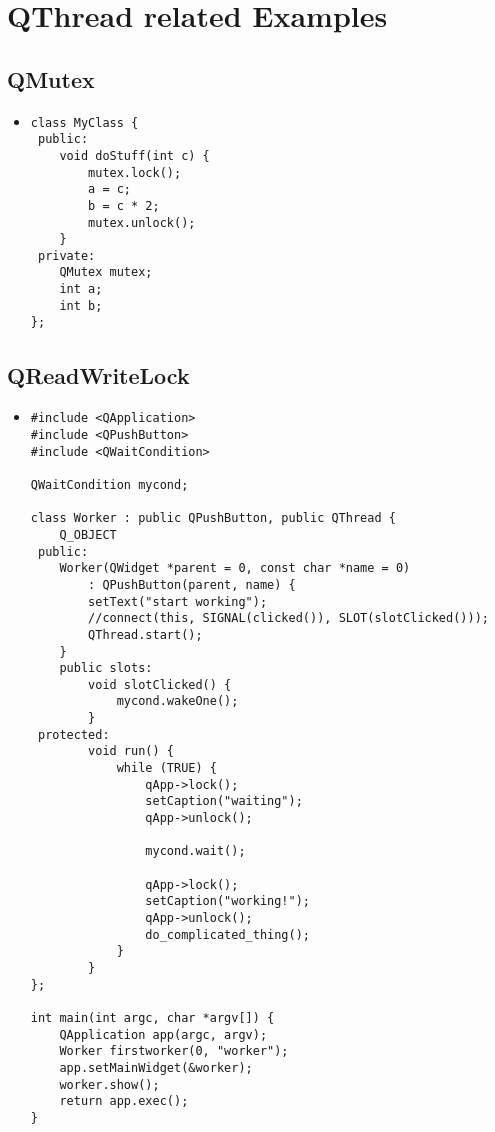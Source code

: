 \documentclass[9pt,b5paper]{article}
\begin{document}
\section{QThread related Examples}
\label{sec-6}
\subsection{QMutex}
\label{sec-6-1}
\begin{itemize}
\item \lstset{language=java,label= ,caption= ,numbers=none}
\begin{lstlisting}
class MyClass {
 public:
    void doStuff(int c) {
        mutex.lock();
        a = c;
        b = c * 2;
        mutex.unlock();
    }
 private:
    QMutex mutex;
    int a;
    int b;
};
\end{lstlisting}
\end{itemize}
\subsection{QReadWriteLock}
\label{sec-6-2}
\begin{itemize}
\item \lstset{language=java,label= ,caption= ,numbers=none}
\begin{lstlisting}
#include <QApplication>
#include <QPushButton>
#include <QWaitCondition>

QWaitCondition mycond;

class Worker : public QPushButton, public QThread {
    Q_OBJECT
 public:
    Worker(QWidget *parent = 0, const char *name = 0)
        : QPushButton(parent, name) {
        setText("start working");
        //connect(this, SIGNAL(clicked()), SLOT(slotClicked()));
        QThread.start();
    }
    public slots:
        void slotClicked() {
            mycond.wakeOne();
        }
 protected:
        void run() {
            while (TRUE) {
                qApp->lock();
                setCaption("waiting");
                qApp->unlock();

                mycond.wait();

                qApp->lock();
                setCaption("working!");
                qApp->unlock();
                do_complicated_thing();
            }
        }
};

int main(int argc, char *argv[]) {
    QApplication app(argc, argv);
    Worker firstworker(0, "worker");
    app.setMainWidget(&worker);
    worker.show();
    return app.exec();
}
\end{lstlisting}
\end{itemize}
\end{document}
